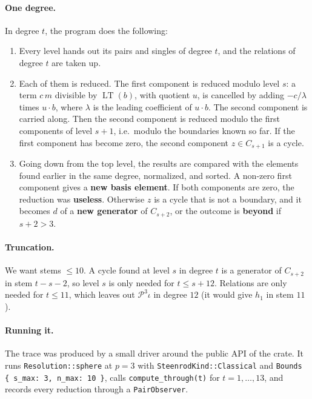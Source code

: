 \documentclass[11pt]{article}
\renewcommand{\P}{\mathcal{P}}
\DeclareMathOperator{\LT}{LT}
\begin{document}
\paragraph{One degree.}
In degree $t$, the program does the following:
\begin{enumerate}
\item Every level hands out its pairs and singles of degree $t$, and the relations of degree
  $t$ are taken up.
\item Each of them is reduced. The first component is reduced modulo level $s$: a term
  $c\,m$ divisible by $\LT(b)$, with quotient $u$, is cancelled by adding $-c/\lambda$ times
  $u \cdot b$, where $\lambda$ is the leading coefficient of $u \cdot b$. The second component
  is carried along. Then the second component is reduced modulo the first components of level
  $s+1$, i.e.\ modulo the boundaries known so far. If the first component has become zero, the
  second component $z \in C_{s+1}$ is a cycle.
\item Going down from the top level, the results are compared with the elements found earlier
  in the same degree, normalized, and sorted. A non-zero first component gives a \textbf{new
  basis element}. If both components are zero, the reduction was \textbf{useless}. Otherwise
  $z$ is a cycle that is not a boundary, and it becomes $d$ of a \textbf{new generator} of
  $C_{s+2}$, or the outcome is \textbf{beyond} if $s + 2 > 3$.
\end{enumerate}

\paragraph{Truncation.}
We want stems $\le 10$. A cycle found at level $s$ in degree $t$ is a generator of $C_{s+2}$ in
stem $t-s-2$, so level $s$ is only needed for $t \le s + 12$. Relations are only needed for
$t \le 11$, which leaves out $\P^3\iota$ in degree $12$ (it would give $h_1$ in stem $11$).

\paragraph{Running it.}\sloppy
The trace was produced by a small driver around the public API of the crate. It runs
\texttt{Resolution::sphere} at $p = 3$ with \texttt{SteenrodKind::Classical} and
\texttt{Bounds \{ s\_max: 3, n\_max: 10 \}}, calls \texttt{compute\_through(t)} for
$t = 1, \dots, 13$, and records every reduction through a \texttt{PairObserver}.
\end{document}
